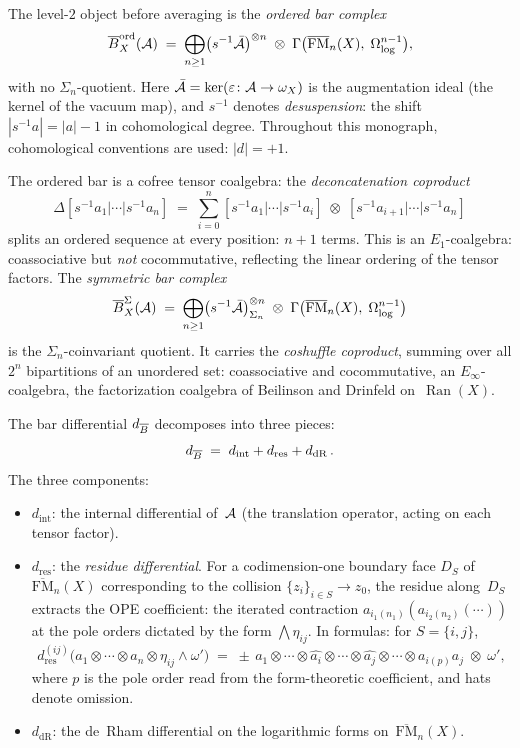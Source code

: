 The level-$2$ object before averaging is the \emph{ordered bar complex}
\[
\overline{B}^{\mathrm{ord}}_X(\mathcal{A})
\;=\;
\bigoplus_{n\ge 1}
\bigl(s^{-1}\bar{\mathcal{A}}\bigr)^{\otimes n}
\;\otimes\;
\Gamma\bigl(\overline{\mathrm{FM}}_n(X),\;
\Omega^{n-1}_{\log}\bigr),
\]
with no $\Sigma_n$-quotient. Here $\bar{\mathcal{A}} = \ker(\varepsilon\colon\mathcal{A}\to\omega_X)$ is the
augmentation ideal (the kernel of the vacuum map), and
$s^{-1}$ denotes \emph{desuspension}: the shift
$|s^{-1}a| = |a| - 1$ in cohomological degree. Throughout this
monograph, cohomological conventions are used: $|d| = +1$.

The ordered bar is a cofree tensor coalgebra: the \emph{deconcatenation coproduct}
\[
\Delta[s^{-1}a_1|\cdots|s^{-1}a_n]
\;=\;
\sum_{i=0}^{n}
[s^{-1}a_1|\cdots|s^{-1}a_i]
\;\otimes\;
[s^{-1}a_{i+1}|\cdots|s^{-1}a_n]
\]
splits an ordered sequence at every position: $n+1$ terms. This is an
$E_1$-coalgebra: coassociative but \emph{not} cocommutative, reflecting the
linear ordering of the tensor factors. The \emph{symmetric bar complex}
\[
\overline{B}^{\Sigma}_X(\mathcal{A})
\;=\;
\bigoplus_{n\ge 1}
\bigl(s^{-1}\bar{\mathcal{A}}\bigr)^{\otimes n}_{\Sigma_n}
\;\otimes\;
\Gamma\bigl(\overline{\mathrm{FM}}_n(X),\;
\Omega^{n-1}_{\log}\bigr)
\]
is the $\Sigma_n$-coinvariant quotient. It carries the \emph{coshuffle coproduct},
summing over all $2^n$ bipartitions of an unordered set: coassociative and cocommutative,
an $E_\infty$-coalgebra, the factorization coalgebra of Beilinson and Drinfeld
on~$\operatorname{Ran}(X)$.

The bar differential $d_{\overline{B}}$ decomposes into three pieces:
\[
d_{\overline{B}}
\;=\;
d_{\mathrm{int}}+d_{\mathrm{res}}+d_{\mathrm{dR}}\,.
\]
The three components:
\begin{itemize}
\item $d_{\mathrm{int}}$: the internal differential of~$\mathcal{A}$
(the translation operator, acting on each tensor factor).
\item $d_{\mathrm{res}}$: the \emph{residue differential}. For
a codimension-one boundary face $D_S$ of
$\overline{\mathrm{FM}}_n(X)$ corresponding to the collision
$\{z_i\}_{i\in S}\to z_0$, the residue along~$D_S$ extracts
the OPE coefficient: the iterated contraction
$a_{i_1(n_1)}(a_{i_2(n_2)}(\cdots))$ at the pole orders
dictated by the form $\bigwedge\eta_{ij}$. In formulas: for
$S=\{i,j\}$,
\[
d_{\mathrm{res}}^{(ij)}
\bigl(
a_1\otimes\cdots\otimes a_n\otimes\eta_{ij}\wedge\omega'
\bigr)
\;=\;
\pm\,
a_1\otimes\cdots\otimes
\widehat{a_i}\otimes\cdots\otimes
\widehat{a_j}\otimes\cdots\otimes
a_{i(p)}a_j
\;\otimes\;
\omega',
\]
where $p$ is the pole order read from the form-theoretic
coefficient, and hats denote omission.
\item $d_{\mathrm{dR}}$: the de~Rham differential on the
logarithmic forms on~$\overline{\mathrm{FM}}_n(X)$.
\end{itemize}


